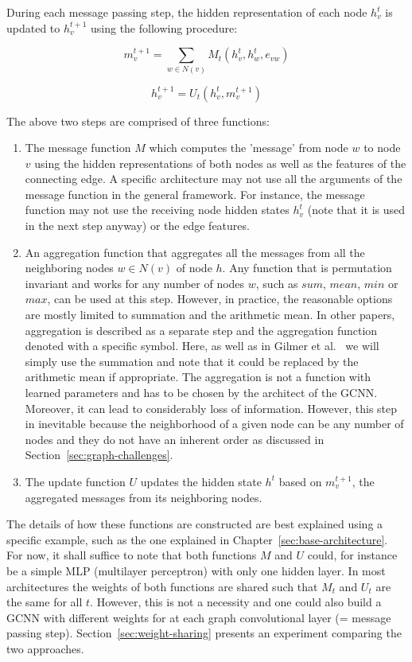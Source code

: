 During each message passing step, the hidden representation of each node $h_v^t$ is updated to $h_v^{t+1}$ using the following procedure:

\begin{equation}
m_v^{t+1} = \sum_{w \in N(v)} M_t(h_v^t, h_w^t, e_{vw})
\end{equation}
\label{eq:message-function}

\begin{equation}
h_v^{t+1} = U_t(h_v^t, m_v^{t+1})
\end{equation}
\label{eq:update-function}

The above two steps are comprised of three functions:

\begin{enumerate}
	\item The message function $M$ which computes the 'message' from node $w$ to node $v$ using the hidden representations of both nodes as well as the features of the connecting edge. A specific architecture may not use all the arguments of the message function in the general framework. For instance, the message function may not use the receiving node hidden states $h_v^t$ (note that it is used in the next step anyway) or the edge features.
	\item An aggregation function that aggregates all the messages from all the neighboring nodes $w \in N(v)$ of node $h$. Any function that is permutation invariant and works for any number of nodes $w$, such as $sum$, $mean$, $min$ or $max$, can be used at this step. However, in practice, the reasonable options are mostly limited to summation and the arithmetic mean.	
	In other papers, aggregation is described as a separate step and the aggregation function denoted with a specific symbol. Here, as well as in Gilmer et al.~\cite{Gilmer2017} we will simply use the summation and note that it could be replaced by the arithmetic mean if appropriate.
	The aggregation is not a function with learned parameters and has to be chosen by the architect of the GCNN. Moreover, it can lead to considerably loss of information. However, this step in inevitable because the neighborhood of a given node can be any number of nodes and they do not have an inherent order as discussed in Section~\ref{sec:graph-challenges}.
	\item The update function $U$ updates the hidden state $h^t$ based on  $m_v^{t+1}$, the aggregated messages from its neighboring nodes.
\end{enumerate}

The details of how these functions are constructed are best explained using a specific example, such as the one explained in Chapter~\ref{sec:base-architecture}.
For now, it shall suffice to note that both functions $M$ and $U$ could, for instance be a simple MLP (multilayer perceptron) with only one hidden layer. In most architectures the weights of both functions are shared such that $M_t$ and $U_t$ are the same for all $t$. However, this is not a necessity and one could also build a GCNN with different weights for at each graph convolutional layer (= message passing step). Section~\ref{sec:weight-sharing} presents an experiment comparing the two approaches.

